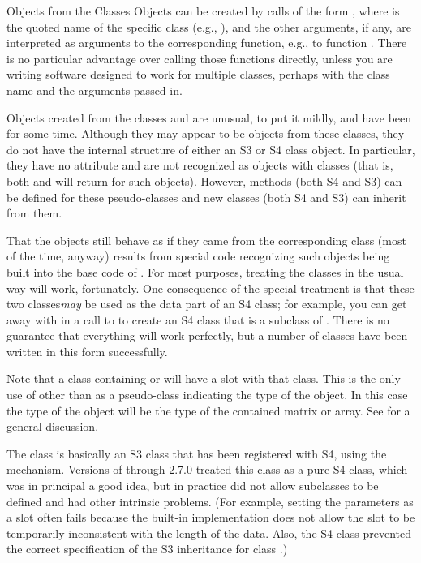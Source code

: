 %
\begin{Section}{Objects from the Classes}
Objects can be created by calls of the form ,
where  is the quoted name of the specific class (e.g.,
), and the other arguments, if any, are interpreted as
arguments to the corresponding function, e.g., to function
.  There is no particular advantage over calling those
functions directly, unless you are writing software designed to work
for multiple classes, perhaps with the class name and the arguments
passed in.

Objects created from the classes  and 
are unusual, to put it mildly, and have been for some time.  Although
they may appear to be objects from these classes, they do not have the
internal structure of either an S3 or S4 class object.  In particular,
they have no  attribute and are not recognized as
objects with classes (that is, both  and
 will return  for such objects).
However, methods (both S4 and S3) can be defined for these
pseudo-classes and new classes (both S4 and S3) can inherit from them.

That the objects still behave as if they came from the corresponding
class (most of the time, anyway) results from special code
recognizing such objects being built into the base code of \R{}.
For most purposes, treating the classes in the usual way will work,
fortunately.  One consequence of the special treatment is that these
two classes\emph{may} be used as the data part of an S4 class; for
example, you can get away with  in a call
to  to create an S4 class that is a subclass
of .  There is no guarantee that everything will work
perfectly, but a number of classes have been written in this form
successfully.

Note that a class containing  or  will
have a   slot with that class.  This is the only use of
 other than as a pseudo-class indicating the type of the
object.  In this case the type of the object will be the type of the
contained matrix or array. See  for a general
discussion.

The class   is basically an S3 class
that has been registered with S4, using the
 mechanism.  Versions of \R{} through 2.7.0
treated this class as a pure S4 class, which was in principal a good
idea, but in practice did not allow subclasses to be defined and had
other intrinsic problems.  (For example, setting the
 parameters as a slot often fails because the built-in
implementation does not allow the slot to be temporarily
inconsistent with the length of the data. Also, the S4 class
prevented the correct specification of the S3 inheritance for class
.)


\end{Section}

